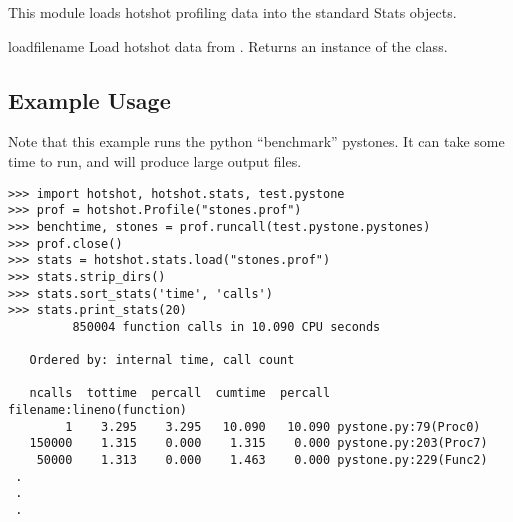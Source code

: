 
This module loads hotshot profiling data into the standard 
Stats objects.

\begin{funcdesc}{load}{filename}
Load hotshot data from . Returns an instance
of the  class.
\end{funcdesc}

\begin{seealso}
\end{seealso}


\subsection{Example Usage \label{hotshot-example}}

Note that this example runs the python ``benchmark'' pystones.  It can
take some time to run, and will produce large output files.

\begin{verbatim}
>>> import hotshot, hotshot.stats, test.pystone
>>> prof = hotshot.Profile("stones.prof")
>>> benchtime, stones = prof.runcall(test.pystone.pystones)
>>> prof.close()
>>> stats = hotshot.stats.load("stones.prof")
>>> stats.strip_dirs()
>>> stats.sort_stats('time', 'calls')
>>> stats.print_stats(20)
         850004 function calls in 10.090 CPU seconds

   Ordered by: internal time, call count

   ncalls  tottime  percall  cumtime  percall filename:lineno(function)
        1    3.295    3.295   10.090   10.090 pystone.py:79(Proc0)
   150000    1.315    0.000    1.315    0.000 pystone.py:203(Proc7)
    50000    1.313    0.000    1.463    0.000 pystone.py:229(Func2)
 .
 .
 .
\end{verbatim}
